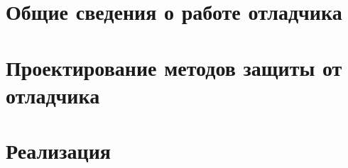 


  \newpage

  \tableofcontents
  \newpage

  \chapter{Общие сведения о работе отладчика}
  
  
  
  
  
  \chapter{Проектирование методов защиты от отладчика}
  
  
  
  
  
  \chapter{Реализация}
  
  


